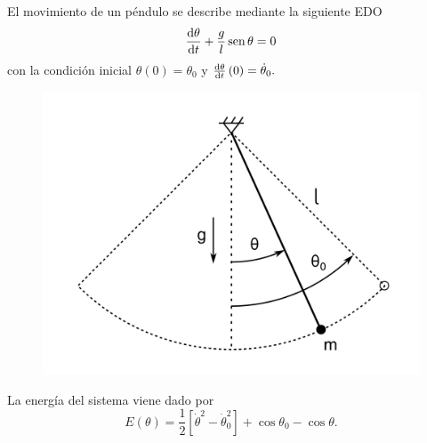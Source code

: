 \begin{questions}

    \question

    El movimiento de un péndulo se describe mediante la siguiente EDO
    \begin{equation*}
        \diff{\theta}{t}+
        \frac{g}{l}
        \operatorname{sen}
        \theta=
        0
    \end{equation*}
    con la condición inicial
    \begin{math}
        \theta\left(0\right)=
        \theta_{0}
    \end{math}
    y
    \begin{math}
        \diff{\theta}{t}
        \left(0\right)=
        \dot{\theta}_{0}.
    \end{math}

    \begin{figure}[ht!]
        \centering
        \includegraphics[width=.2\paperwidth]{pendulum.png}
    \end{figure}
    La energía del sistema viene dado por
    \begin{equation*}
        E\left(\theta\right)=
        \frac{1}{2}
        \left[
            \dot{\theta}^{2}-\dot{\theta}_{0}^{2}
            \right]+
        \cos\theta_{0}-
        \cos\theta.
    \end{equation*}


\end{questions}
